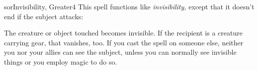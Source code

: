 
\begin{spellcard}{sor}{Invisibility, Greater}{4}
  \newcommand{\name}{Invisibility, Greater}
  \newcommand{\school}{illusion}
  \newcommand{\subschool}{glamer}
  \newcommand{\descriptor}{NULL}
  \newcommand{\spelllevel}{4}
  \newcommand{\castingtime}{1 standard action}
  \newcommand{\components}{V, S}
  \newcommand{\costlycomponents}{0}
  \newcommand{\range}{personal or touch}
  \newcommand{\area}{NULL}
  \newcommand{\effect}{NULL}
  \newcommand{\targets}{NULL}%
  \newcommand{\duration}{1 round/level}
  \newcommand{\dismissible}{1}
  \newcommand{\shapeable}{0}
  \newcommand{\savingthrow}{Will negates (harmless)}
  \newcommand{\spellresistance}{yes (harmless)}
  \newcommand{\source}{PFRPG Core}
  \newcommand{\verbal}{1}
  \newcommand{\somatic}{1}
  \newcommand{\material}{0}
  \newcommand{\focus}{0}
  \newcommand{\divinefocus}{0}
  \newcommand{\deity}{NULL}
  \newcommand{\SLALevel}{4}
  \newcommand{\domain}{NULL}
  \newcommand{\acid}{0}
  \newcommand{\air}{0}
  \newcommand{\chaotic}{0}
  \newcommand{\cold}{0}
  \newcommand{\curse}{0}
  \newcommand{\darkness}{0}
  \newcommand{\death}{0}
  \newcommand{\disease}{0}
  \newcommand{\earth}{0}
  \newcommand{\electricity}{0}
  \newcommand{\emotion}{0}
  \newcommand{\evil}{0}
  \newcommand{\fear}{0}
  \newcommand{\fire}{0}
  \newcommand{\force}{0}
  \newcommand{\good}{0}
  \newcommand{\languagedependent}{0}
  \newcommand{\lawful}{0}
  \newcommand{\light}{0}
  \newcommand{\mindaffecting}{0}
  \newcommand{\pain}{0}
  \newcommand{\poison}{0}
  \newcommand{\shadow}{0}
  \newcommand{\sonic}{0}
  \newcommand{\water}{0}
  \newcommand{\linktext}{Invisibility, Greater}
  \newcommand{\id}{299}
  \newcommand{\materialcosts}{NULL}
  \newcommand{\bloodline}{NULL}
  \newcommand{\patron}{NULL}
  \newcommand{\mythictext}{NULL}
  \newcommand{\augmented}{NULL}
  \newcommand{\hauntstatistics}{NULL}
  \newcommand{\ruse}{0}
  \newcommand{\draconic}{0}
  \newcommand{\meditative}{0}
  \spellcardinfo[0.55]{}
  This spell functions like \emph{invisibility,} except that it doesn't
  end if the subject attacks:

  The creature or object touched becomes invisible. If the re\-ci\-pient is a
  creature carrying gear, that vanishes, too. If you cast the spell on
  someone else, neither you nor your allies can see the subject, unless
  you can normally see invisible things or you employ magic to do so.


\end{spellcard}
